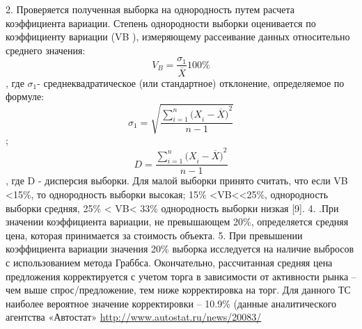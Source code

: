 	2. Проверяется полученная выборка на однородность путем расчета коэффициента вариации. Степень однородности выборки оценивается по коэффициенту вариации (VB ), измеряющему  рассеивание данных относительно среднего значения:
\[  V_B=\frac{\sigma_1}{\overline{X}}100\%  \],  
где $ \sigma_1 $- среднеквадратическое (или стандартное) отклонение, определяемое по формуле:
\[  \sigma_1=\sqrt{\frac{\sum_{i=1}^{n}{{(X}_i-\overline{X})}^2}{n-1}} \];
\[ D= \frac{\sum_{i=1}^{n}{{(X}_i-\overline{X})}^2}{n-1} \] , где D - дисперсия выборки.
	Для малой выборки принято считать, что если VB <15\%, то однородность выборки высокая; 15\% <VB<<25\%, однородность выборки средняя,  25\% < VB< 33\% однородность выборки низкая [9].
	4. .При значении коэффициента вариации, не превышающем 20\%, определяется средняя цена, которая принимается за стоимость объекта.
	5.  При превышении коэффициента вариации значения  20\%  выборка исследуется на наличие выбросов с использованием метода Граббса.
	Окончательно, рассчитанная средняя цена предложения корректируется с учетом торга в зависимости  от активности рынка – чем выше спрос/предложение, тем ниже корректировка на торг. Для данного ТС наиболее вероятное значение корректировки – 10.9\% (данные аналитического агентства «Автостат» \url{http://www.autostat.ru/news/20083/}










